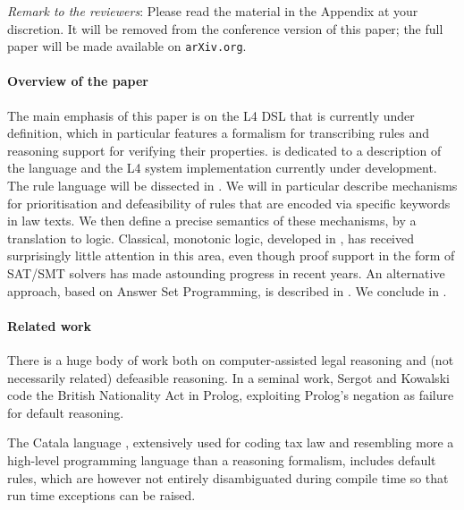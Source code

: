 \begin{tcolorbox}
\emph{Remark to the reviewers}: Please read the material in the Appendix at your
discretion. It will be removed from the conference version of this paper; the
full paper will be made available on \texttt{arXiv.org}.
\end{tcolorbox}

\paragraph{Overview of the paper}
The main emphasis of this paper is on the L4 DSL that is currently under
definition, which in particular features a formalism for transcribing rules
and reasoning support for verifying their properties.  is dedicated to a description of the language
and the L4 system implementation currently under development. The rule
language will be dissected in . We will in
particular describe mechanisms for prioritisation and defeasibility of rules
that are encoded via specific keywords in law texts. We then define a precise
semantics of these mechanisms, by a translation to logic. Classical, monotonic
logic, developed in , has received surprisingly
little attention in this area, even though proof support in the form of
SAT/SMT solvers has made astounding progress in recent years. An alternative
approach, based on Answer Set Programming, is described in
. We conclude in .


\paragraph{Related work}

There is a huge body of work both on computer-assisted legal reasoning and
(not necessarily related) defeasible reasoning. In a seminal work, Sergot and Kowalski
\cite{sergot_kowalski_etal__british_nationality_acm_1986,kowalski_legislation_logic_programs_1995}
code the British Nationality Act in Prolog, exploiting Prolog's negation as
failure for default reasoning.



The Catala language \cite{merigoux_chataing_protzenko_cata_icfp_2021},
extensively used for coding tax law and resembling more a high-level
programming language than a reasoning formalism, includes default rules, which
are however not entirely disambiguated during compile time so that run time
exceptions can be raised.

